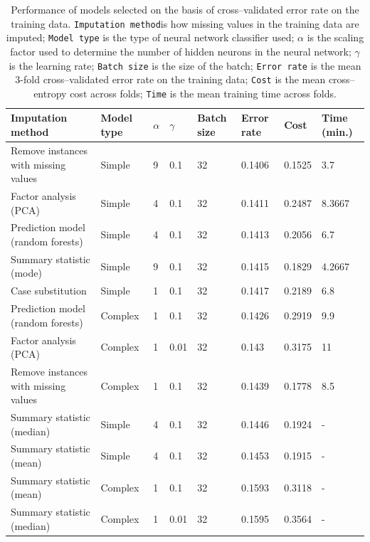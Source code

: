 \documentclass[10pt,twocolumn,letterpaper]{article}
\begin{document}
\begin{table}[htbp]
\begin{center}
\begin{tabular}{llllllll}
\textbf{Imputation method} & \textbf{Model type} & \textbf{$\alpha$} & \textbf{$\gamma$} & \textbf{Batch size} & \textbf{Error rate} & \textbf{Cost} & \textbf{Time (min.)} \\
\hline
      \rowcolor{Gray}
Remove instances with missing values & Simple & 9 & 0.1 & 32 & 0.1406 & 0.1525 & 3.7 \\
Factor analysis (PCA)  & Simple & 4 & 0.1 & 32 & 0.1411 & 0.2487 & 8.3667 \\
      \rowcolor{Gray}
Prediction model (random forests) & Simple & 4 & 0.1 & 32 & 0.1413 & 0.2056 & 6.7 \\
      \rowcolor{Gray}
Summary statistic (mode) & Simple & 9 & 0.1 & 32 & 0.1415 & 0.1829 & 4.2667 \\
Case substitution & Simple & 1 & 0.1 & 32 & 0.1417 & 0.2189 & 6.8 \\
Prediction model  (random forests) & Complex & 1 & 0.1 & 32 & 0.1426 & 0.2919 & 9.9 \\
Factor analysis (PCA) & Complex & 1 & 0.01 & 32 & 0.143 & 0.3175 & 11 \\
Remove instances with missing values & Complex & 1 & 0.1 & 32 & 0.1439 & 0.1778 & 8.5 \\
Summary statistic (median) & Simple & 4 & 0.1 & 32 & 0.1446 & 0.1924 & - \\
Summary statistic (mean) & Simple & 4 & 0.1 & 32 & 0.1453 & 0.1915 & - \\
Summary statistic (mean) & Complex & 1 & 0.1 & 32 & 0.1593 & 0.3118 & - \\
Summary statistic  (median) & Complex & 1 & 0.01 & 32 & 0.1595 & 0.3564 & - \\
\hline
\end{tabular}
\end{center}
\caption{Performance of models selected on the basis of cross--validated error rate on the training data. \texttt{Imputation method}is how missing values in the training data are imputed; \texttt{Model type} is the type of neural network classifier used; \texttt{$\alpha$} is the scaling factor used to determine the number of hidden neurons in the neural network; \texttt{$\gamma$} is the learning rate; \texttt{Batch size} is the size of the batch; \texttt{Error rate} is the mean 3-fold cross--validated error rate on the training data;  \texttt{Cost} is the mean cross--entropy cost across folds; \texttt{Time} is the mean training time across folds. }
\label{tab:err-rates}
\end{table}
\end{document}
